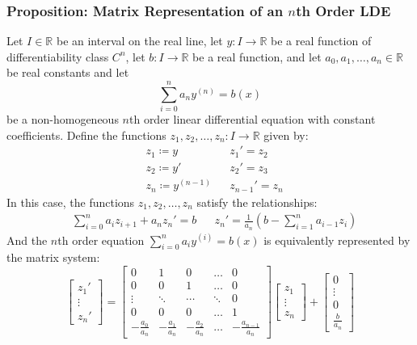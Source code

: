 \documentclass[11pt, a4paper]{article}
\newcommand{\R}{\mathbb{R}} %
\begin{document}
\subsubsection{Proposition: Matrix Representation of an $ n $th Order LDE}
Let $ I \in \R $ be an interval on the real line, let $ y: I \to \R $ be a real function of differentiability class $ C^n $, let $ b: I \to \R $ be a real function, and let $ a_0, a_1, \dots, a_n \in \R$ be real constants and let
\begin{equation*}
	\sum_{i=0}^{n}a_{n}y^{(n)} = b(x)
\end{equation*}
be a non-homogeneous $ n $th order linear differential equation with constant coefficients. Define the functions $ z_1, z_2, \dots, z_n : I \to \R $ given by:
\begin{align*}
	&z_1 \coloneqq y && z_1' = z_2\\
	&z_2 \coloneqq y' && z_2' = z_3\\
	&z_n \coloneqq y^{(n-1)} && z_{n-1}' = z_n
\end{align*}
In this case, the functions $ z_1, z_2, \dots, z_n $ satisfy the relationships:
\begin{align*}
	&\sum_{i=0}^{n} a_i z_{i+1} + a_{n} z_{n}' = b  &&  z_n' = \frac{1}{a_n} \left(b - \sum_{i=1}^{n} a_{i-1}z_i  \right)
\end{align*}
And the $ n $th order equation $ \sum_{i=0}^{n}a_{i}y^{(i)} = b(x) $ is equivalently represented by the matrix system:
\[
\begin{bmatrix}
	z_1 ' \\[1.0ex]
	\vdots \\[1.0ex]
	z_n '
\end{bmatrix}
= 
\begin{bmatrix}
	0 & 1 & 0 & \dots & 0\\[1.0ex]
	0 & 0 & 1 & \dots & 0 \\[1.0ex]
	\vdots & \ddots & \cdots & \ddots & 0 \\[1.0ex]
	0 & 0 & 0 & \dots & 1 \\[1.0ex]
	- \frac{a_0}{a_n} & - \frac{a_1}{a_n} & - \frac{a_2}{a_n} & \dots & - \frac{a_{n-1}}{a_n}
\end{bmatrix}
\begin{bmatrix}
	z_1 \\[1.0ex]
	\vdots \\[1.0ex]
	z_n
\end{bmatrix}
+ 
\begin{bmatrix}
	0 \\[1.0ex]
	\vdots \\[1.0ex]
	0 \\[1.0ex]
	\frac{b}{a_n}
\end{bmatrix}
\]
\end{document}
